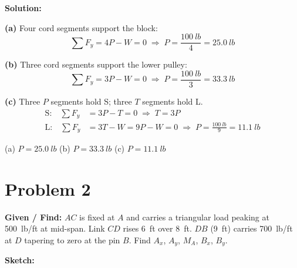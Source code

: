 \documentclass[11pt]{article}
\newcommand{\problemhead}[2]{%
    \clearpage
    \section*{Problem #1}
    \textbf{Given / Find:} #2
}
\begin{document}
\textbf{Solution:}

\textbf{(a)} Four cord segments support the block:
\[
\textstyle\sum F_y = 4P - W = 0 \;\Rightarrow\; P = \frac{\SI{100}{lb}}{4} = \SI{25.0}{lb}
\]

\textbf{(b)} Three cord segments support the lower pulley:
\[
\textstyle\sum F_y = 3P - W = 0 \;\Rightarrow\; P = \frac{\SI{100}{lb}}{3} = \SI{33.3}{lb}
\]

\textbf{(c)} Three $P$ segments hold S; three $T$ segments hold L.
\begin{align*}
\text{S:}\quad \textstyle\sum F_y &= 3P - T = 0 \;\Rightarrow\; T = 3P\\
\text{L:}\quad \textstyle\sum F_y &= 3T - W = 9P - W = 0 \;\Rightarrow\; P = \frac{\SI{100}{lb}}{9} = \SI{11.1}{lb}
\end{align*}

\begin{finalanswer}
(a) $P = \SI{25.0}{lb}$ \qquad (b) $P = \SI{33.3}{lb}$ \qquad (c) $P = \SI{11.1}{lb}$
\end{finalanswer}

\problemhead{2}{$AC$ is fixed at $A$ and carries a triangular load peaking at \SI{500}{lb/ft} at mid-span. Link $CD$ rises \SI{6}{ft} over \SI{8}{ft}. $DB$ (\SI{9}{ft}) carries \SI{700}{lb/ft} at $D$ tapering to zero at the pin $B$. Find $A_x$, $A_y$, $M_A$, $B_x$, $B_y$.}

\textbf{Sketch:}
\end{document}
